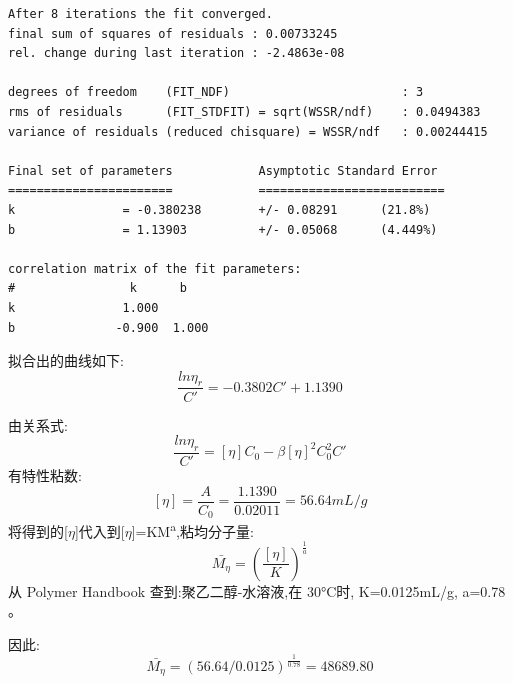 \documentclass[11pt]{report}
\begin{document}
\begin{enumerate}
\begin{verbatim}
After 8 iterations the fit converged.
final sum of squares of residuals : 0.00733245
rel. change during last iteration : -2.4863e-08

degrees of freedom    (FIT_NDF)                        : 3
rms of residuals      (FIT_STDFIT) = sqrt(WSSR/ndf)    : 0.0494383
variance of residuals (reduced chisquare) = WSSR/ndf   : 0.00244415

Final set of parameters            Asymptotic Standard Error
=======================            ==========================
k               = -0.380238        +/- 0.08291      (21.8%)
b               = 1.13903          +/- 0.05068      (4.449%)

correlation matrix of the fit parameters:
#                k      b      
k               1.000 
b              -0.900  1.000 

\end{verbatim}
拟合出的曲线如下:
\[
\frac{ln\eta_{r}}{C'}=-0.3802C'+1.1390
\]

由关系式:
\[
\frac{ln\eta_{r}}{C'}=[\eta]C_{0}-\beta[\eta]^{2}C_{0}^{2}C'
\]
有特性粘数:
\[
[\eta]=\frac{A}{C_{0}}=\frac{1.1390}{0.02011}=56.64mL/g
\]
将得到的[\(\eta\)]代入到[\(\eta\)]=KM\textsuperscript{a},粘均分子量:
\[
\bar{M_{\eta}}=\left(\frac{[\eta]}{K}\right)^{\frac{1}{a}}
\]
从 Polymer Handbook 查到:聚乙二醇-水溶液,在 30°C时, K=0.0125mL/g,
a=0.78 。

因此:
\[
\bar{M_{\eta}}=(56.64/0.0125)^{\frac{1}{0.78}}=48689.80
\]
\end{enumerate}
\end{document}

